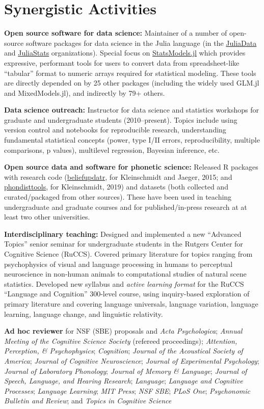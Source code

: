 \documentclass[11pt]{article}
\begin{document}
\section{Synergistic Activities}

\textbf{Open source software for data science:} Maintainer of a number of
open-source software packages for data science in the Julia language (in the
\href{https://github.com/JuliaData/}{JuliaData} and
\href{https://github.com/JuliaStats}{JuliaStats} organizations).  Special focus
on \href{https://github.com/JuliaStats/StatsModels.jl}{StatsModels.jl} which
provides expressive, performant tools for users to convert data from
spreadsheet-like ``tabular'' format to numeric arrays required for statistical
modeling.  These tools are directly depended on by 25 other packages (including
the widely used GLM.jl and MixedModels.jl), and indirectly by 79+ others.

\textbf{Data science outreach:} Instructor for data science and statistics
workshops for graduate and undergraduate students (2010--present).  Topics
include using version control and notebooks for reproducible research,
understanding fundamental statistical concepts (power, type I/II errors,
reproducibility, multiple comparisons, p values), multilevel regression,
Bayesian inference, etc.

\textbf{Open source data and software for phonetic science:} Released R packages
with research code
(\href{https://github.com/kleinschmidt/beliefupdatr}{beliefupdatr}, for
Kleinschmidt and Jaeger, 2015; and
\href{https://github.com/kleinschmidt/phondisttools}{phondisttools}, for
Kleinschmidt, 2019) and datasets (both collected and curated/packaged from other
sources).  These have been used in teaching undergraduate and graduate courses
and for published/in-press research at at least two other universities.

\textbf{Interdisciplinary teaching:} Designed and implemented a new ``Advanced
Topics'' senior seminar for undergraduate students in the Rutgers Center for
Cognitive Science (RuCCS).  Covered primary literature for topics ranging from
psychophysics of visual and language processing in humans to perceptual
neuroscience in non-human animals to computational studies of natural scene
statistics.  Developed new syllabus and \emph{active learning format} for the
RuCCS ``Language and Cognition'' 300-level course, using inquiry-based
exploration of primary literature and covering language universals, language
variation, language learning, language change, and linguistic relativity.

\textbf{Ad hoc reviewer} for NSF (SBE) proposals and
  \emph{Acta Psychologica};
  \emph{Annual Meeting of the Cognitive Science Society} (refereed proceedings);
  \emph{Attention, Perception, \& Psychophysics};
  \emph{Cognition};
  \emph{Journal of the Acoustical Society of America};
  \emph{Journal of Cognitive Neuroscience};
  \emph{Journal of Experimental Psychology};
  \emph{Journal of Laboratory Phonology};
  \emph{Journal of Memory \& Language};
  \emph{Journal of Speech, Language, and Hearing Research};
  \emph{Language};
  \emph{Language and Cognitive Processes};
  \emph{Language Learning};
  \emph{MIT Press};
  \emph{NSF SBE};
  \emph{PLoS One};
  \emph{Psychonomic Bulletin and Review}; and
  \emph{Topics in Cognitive Science}
\end{document}
